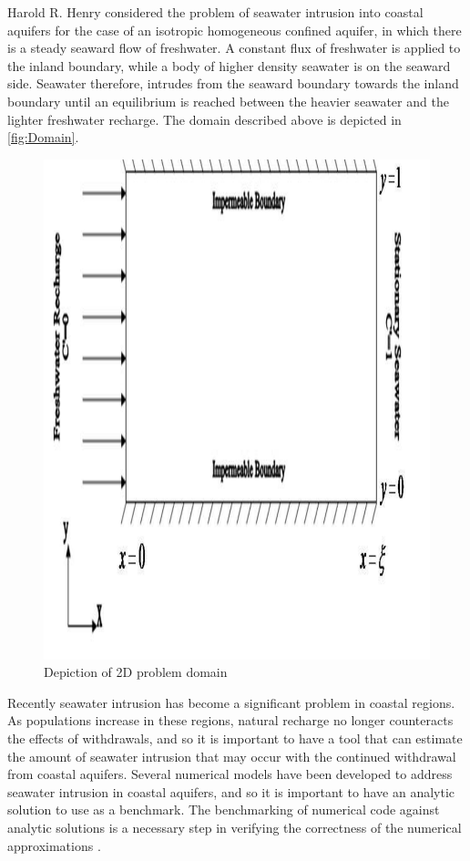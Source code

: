 Harold R. Henry \cite{Henry60} \cite{Henry64} considered the problem of seawater intrusion into
coastal aquifers for the case of an isotropic homogeneous confined aquifer, in which there is a
steady seaward flow of freshwater. A constant flux of freshwater is applied to the inland boundary,
while a body of higher density seawater is on the seaward side. Seawater therefore, intrudes from
the seaward boundary towards the inland boundary until an equilibrium is reached between the heavier
seawater and the lighter freshwater recharge. The domain described above is depicted in
\autoref{fig:Domain}.

\begin{figure}[htp]
    \centering
    \includegraphics[scale=0.25]
    {image1}
    \caption{Depiction of 2D problem domain} \label{fig:Domain}
\end{figure}

Recently seawater intrusion has become a significant problem in coastal regions.  As populations
increase in these regions, natural recharge no longer counteracts the effects of withdrawals, and so
it is important to have a tool that can estimate the amount of seawater intrusion that may occur
with the continued withdrawal from coastal aquifers. Several numerical models have been developed to
address seawater intrusion in coastal aquifers, and so it is important to have an analytic solution
to use as a benchmark. The benchmarking of numerical code against analytic solutions is a necessary
step in verifying the correctness of the numerical approximations \cite{Simpson}.

